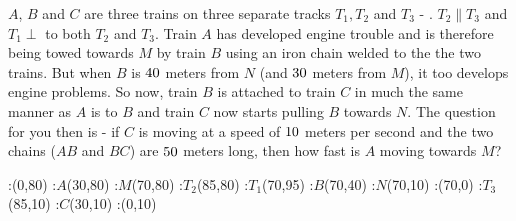 


\question $A$, $B$ and $C$ are three trains on three separate tracks $T_1, T_2$ and $T_3$
- \asif. $T_2\parallel T_3$ and $T_1\perp$ to both $T_2$ and $T_3$. Train $A$ has developed engine 
trouble and is therefore being towed towards $M$ by train $B$ using an iron chain welded to the 
the two trains. But when $B$ is $40$ meters from $N$ (and $30$ meters from $M$), it too
develops engine problems. So now, train $B$ is attached to train $C$ in much the same manner 
as $A$ is to $B$ and train $C$ now starts pulling $B$ towards $N$. The question for you then is
- if $C$ is moving at a speed of $10$ meters per second and the two chains ($AB$ and $BC$)
are $50$ meters long, then how fast is $A$ moving towards $M$?


\watchout[-5cm]

  \begin{marginfigure}[-4cm]
      :(0,80) %
      :$A$(30,80)
      :$M$(70,80)
      :$T_2$(85,80)
      :$T_1$(70,95) %
      :$B$(70,40)
      :$N$(70,10)
      :(70,0)
      :$T_3$(85,10) %
      :$C$(30,10)
      :(0,10)
    \figdrawbegin{}
      \figdrawline [100,101,102,103]
      \figdrawline [104,105,106,107]
      \figdrawline [108,109,110]
      \figdrawline [101,105,109]
    \figdrawend
    \centerline{\box\figBoxA}
  \end{marginfigure}


